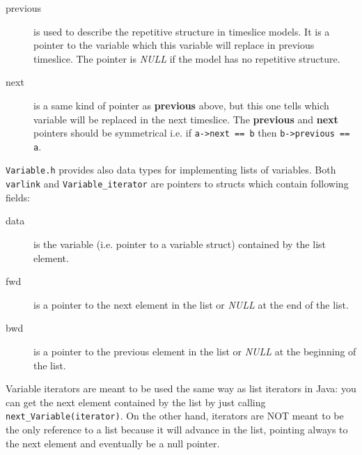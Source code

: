 \documentclass[12pt,a4paper]{report}
\begin{document}
\begin{description}
\item[previous] is used to describe the repetitive structure in
timeslice models. It is a pointer to the variable which this variable
will replace in previous timeslice. The pointer is {\it NULL} if the
model has no repetitive structure.

\item[next] is a same kind of pointer as \textbf{previous} above, but
this one tells which variable will be replaced in the next timeslice.
The \textbf{previous} and \textbf{next} pointers should be symmetrical
i.e. if \verb+a->next == b+ then \verb+b->previous == a+.
\end{description}

\verb+Variable.h+ provides also data types for implementing lists of
variables. Both \verb+varlink+ and \verb+Variable_iterator+ are
pointers to structs which contain following fields:
\begin{description}
\item[data] is the variable (i.e. pointer to a variable struct) 
contained by the list element.

\item[fwd] is a pointer to the next element in the list or {\it NULL}
at the end of the list.

\item[bwd] is a pointer to the previous element in the list or 
{\it NULL} at the beginning of the list.
\end{description}
Variable iterators are meant to be used the same way as list iterators
in Java: you can get the next element contained by the list by just 
calling \verb+next_Variable(iterator)+. On the other hand, iterators
are NOT meant to be the only reference to a list because it will
advance in the list, pointing always to the next element and eventually
be a null pointer.
\end{document}

